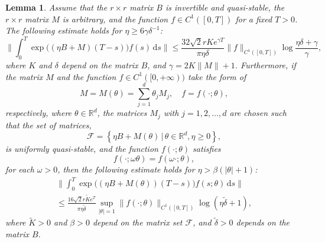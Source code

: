 \documentclass{article}
\theoremstyle{plain}%
\newtheorem{lemma}{Lemma}%
\theoremstyle{definition}%
\theoremstyle{remark}%
\newcommand{\bR}{\mathbb{R}}
\newcommand{\cF}{\mathcal{F}}
\newcommand{\rd}{\mathrm{d}}
\newcommand{\+}[1]{{\bm{#1}}}
\newcommand{\norm}[1]{\|{#1}\|}
\begin{document}
\begin{lemma}\label{lemma:gRL}
  Assume that the $r \times r$ matrix $B$ is invertible and 
  quasi-stable, the $r \times r$ matrix $M$ is arbitrary,
  and the function $f \in C^1([0, T])$ for a fixed $T > 0$.
  The following estimate holds for 
  $\eta \ge 6 \gamma \delta^{-1}$:
  \begin{displaymath}
    \bigg\| \int_0^T \exp \big( (\eta B + M) (T - s) \big) f(s) 
    \,\rd s \bigg\| \le \frac{32 \sqrt{2} r K e^{\gamma T}}
    {\pi \eta \delta} \|f\|_{C^1([0, T])} \log 
    \frac{\eta \delta + \gamma}{\gamma},
  \end{displaymath}
  where $K$ and $\delta$ depend on the matrix $B$, and 
  $\gamma = 2 K \norm{M} + 1$.
  Furthermore, if the matrix $M$ and the function 
  $f \in C^1([0, +\infty))$ take the form of 
  \begin{displaymath}
    M = M(\theta) = \sum_{j = 1}^d \theta_j M_j, \quad 
    f = f(\cdot; \theta),
  \end{displaymath}
  respectively, where $\theta \in \bR^d$, the matrices $M_j$ with 
  $j = 1, 2, \ldots, d$ are chosen such that the set of matrices,
  \begin{displaymath}
    \cF = \left\{ \eta B + M(\theta) \,\big|\, 
    \theta \in \bR^d, \eta \ge 0 \right\},
  \end{displaymath}
  is uniformly quasi-stable, 
  and the function $f(\cdot; \theta)$ satisfies 
  \begin{displaymath}
    f(\cdot; \omega \theta) = f(\omega \cdot; \theta),
  \end{displaymath}
  for each $\omega > 0$,
  then the following estimate holds for $\eta >\beta (|\theta| + 1)$:
  \begin{multline*}
    \bigg\| \int_0^T \exp \big( (\eta B + M(\theta)) (T - s) \big) 
    f(s; \theta) \,\rd s \bigg\| \\ \le
    \frac{16 \sqrt{2} r \tilde{K} e^T}{\pi \eta \tilde{\delta}} 
    \sup_{|\theta| = 1} \|f(\cdot; \theta)\|_{C^1([0, T])} 
    \log(\eta \tilde{\delta} + 1), 
  \end{multline*}
  where $\tilde{K} > 0$ and $\beta > 0$ depend on the matrix 
  set $\cF$, and $\tilde{\delta} > 0$ depends on the matrix $B$.
\end{lemma}
\end{document}
